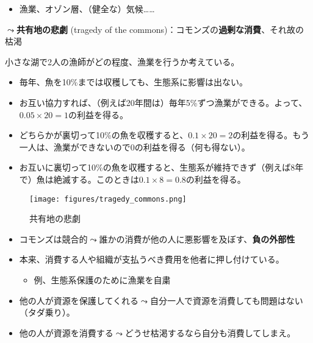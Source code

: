 \documentclass[
  xelatex,
  ja=standard]{bxjsarticle}
\providecommand{\tightlist}{%
  \setlength{\itemsep}{0pt}\setlength{\parskip}{0pt}}\usepackage{longtable,booktabs,array}
\begin{document}
\begin{itemize}
\tightlist
\item
  漁業、オゾン層、（健全な）気候\ldots\ldots{}
\end{itemize}

\(\leadsto\)\textbf{共有地の悲劇} (tragedy of the
commons)\citep{hardin1968}：コモンズの\textbf{過剰な消費}、それ故の枯渇

\begin{tcolorbox}[enhanced jigsaw, left=2mm, arc=.35mm, breakable, coltitle=black, bottomtitle=1mm, toprule=.15mm, leftrule=.75mm, colbacktitle=quarto-callout-tip-color!10!white, colback=white, colframe=quarto-callout-tip-color-frame, bottomrule=.15mm, titlerule=0mm, toptitle=1mm, opacitybacktitle=0.6, opacityback=0, rightrule=.15mm, title=\textcolor{quarto-callout-tip-color}{\faLightbulb}\hspace{0.5em}{共有地の悲劇}]

小さな湖で2人の漁師がどの程度、漁業を行うか考えている。

\begin{itemize}
\tightlist
\item
  毎年、魚を10\%までは収穫しても、生態系に影響は出ない。
\item
  お互い協力すれば、（例えば20年間は）毎年5\%ずつ漁業ができる。よって、\(0.05 \times 20 = 1\)の利益を得る。
\item
  どちらかが裏切って10\%の魚を収穫すると、\(0.1 \times 20 = 2\)の利益を得る。もう一人は、漁業ができないので\(0\)の利益を得る（何も得ない）。
\item
  お互いに裏切って10\%の魚を収穫すると、生態系が維持できず（例えば8年で）魚は絶滅する。このときは\(0.1 \times 8 = 0.8\)の利益を得る。
\end{itemize}

\end{tcolorbox}

\begin{figure}[htpb]

{\centering \texttt{[image: figures/tragedy\_commons.png]}

}

\caption{共有地の悲劇}

\end{figure}

\begin{itemize}
\tightlist
\item
  コモンズは競合的\(\leadsto\)誰かの消費が他の人に悪影響を及ぼす、\textbf{負の外部性}
\item
  本来、消費する人や組織が支払うべき費用を他者に押し付けている。

  \begin{itemize}
  \tightlist
  \item
    例、生態系保護のために漁業を自粛
  \end{itemize}
\item
  他の人が資源を保護してくれる\(\leadsto\)自分一人で資源を消費しても問題はない（タダ乗り）。
\item
  他の人が資源を消費する\(\leadsto\)どうせ枯渇するなら自分も消費してしまえ。
\end{itemize}
\end{document}
